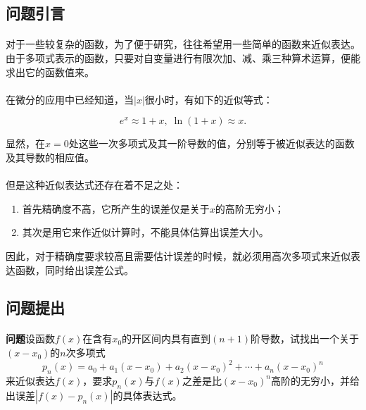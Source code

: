\subsection{问题引言}
\paragraph{}
对于一些较复杂的函数，为了便于研究，往往希望用一些简单的函数来近似表达。由于多项式表示的函数，只要对自变量进行有限次加、减、乘三种算术运算，便能求出它的函数值来。
\paragraph{}
在微分的应用中已经知道，当$|x|$很小时，有如下的近似等式：

\begin{equation}
  e^x \approx 1 + x, \; \ln{(1+x)} \approx x.
\end{equation}

显然，在$x=0$处这些一次多项式及其一阶导数的值，分别等于被近似表达的函数及其导数的相应值。

\paragraph{}
但是这种近似表达式还存在着不足之处：
\begin{enumerate}
  \item 首先精确度不高，它所产生的误差仅是关于$x$的高阶无穷小；
  \item 其次是用它来作近似计算时，不能具体估算出误差大小。
\end{enumerate}
因此，对于精确度要求较高且需要估计误差的时候，就必须用高次多项式来近似表达函数，同时给出误差公式。

\subsection{问题提出}
\paragraph{}
\textbf{问题\;}设函数$f(x)$在含有$x_0$的开区间内具有直到$(n+1)$阶导数，试找出一个关于$(x - x_0)$的$n$次多项式
\begin{equation}
  \label{高阶多项式近似公式}
  p_n(x) = a_0 + a_1(x-x_0)+a_2(x-x_0)^2+ \cdots + a_n(x-x_0)^n
\end{equation}
来近似表达$f(x)$，要求$p_n(x)$与$f(x)$之差是比$(x-x_0)^n$高阶的无穷小，并给出误差$|f(x) - p_n(x)|$的具体表达式。

